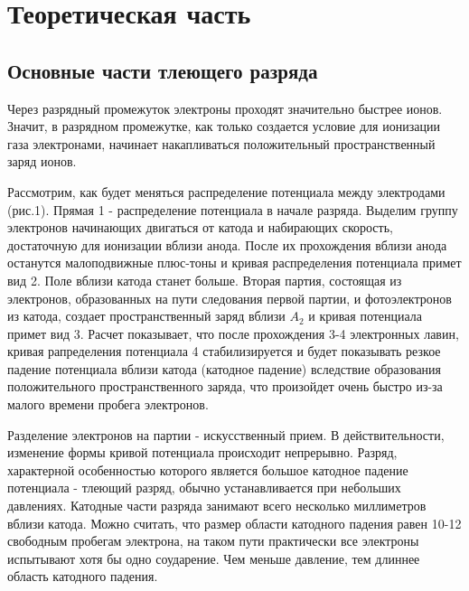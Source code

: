 



\def\labauthors{Войтович Д.А., Понур К.А.}
\def\labgroup{440}
\def\labnumber{2}
\def\labtheme{Исследование биполярных процессов переноса тока в тлеющем разряде}
\renewcommand{\vec}{\mathbf}
\renewcommand{\phi}{\varphi}
\renewcommand{\hat}{\widehat}



\section{Теоретическая часть}
\subsection{Основные части тлеющего разряда}
Через разрядный промежуток электроны проходят значительно быстрее ионов. Значит, в разрядном промежутке, как только
 создается условие для ионизации газа электронами, начинает накапливаться положительный пространственный заряд 
 ионов.

Рассмотрим, как будет меняться распределение потенциала между электродами (рис.1). Прямая 1 - распределение
 потенциала в начале разряда. Выделим группу электронов начинающих двигаться от катода и набирающих скорость,
 достаточную для ионизации вблизи анода. После их прохождения вблизи анода останутся малоподвижные плюс-тоны и
  кривая распределения потенциала примет вид 2. Поле вблизи катода станет больше. Вторая партия, состоящая из 
  электронов, образованных на пути следования первой партии, и фотоэлектронов из катода, создает пространственный 
  заряд вблизи $A_2$ и кривая потенциала примет вид 3. Расчет показывает, что после прохождения 3-4 электронных 
  лавин, кривая рапределения потенциала 4 стабилизируется и будет показывать резкое падение потенциала вблизи 
  катода (катодное падение) вследствие образования положительного пространственного заряда, что произойдет очень 
  быстро из-за малого времени пробега электронов.

  Разделение электронов на партии - искусственный прием. В действительности, изменение формы кривой потенциала 
  происходит непрерывно. Разряд, характерной особенностью которого является большое катодное падение потенциала -
   тлеющий разряд, обычно устанавливается при небольших давлениях. Катодные части разряда занимают всего несколько 
   миллиметров вблизи катода. Можно считать, что размер области катодного падения равен 10-12 свободным пробегам 
   электрона, на таком пути практически все электроны испытывают хотя бы одно соударение. Чем меньше давление, тем 
   длиннее область катодного падения.

